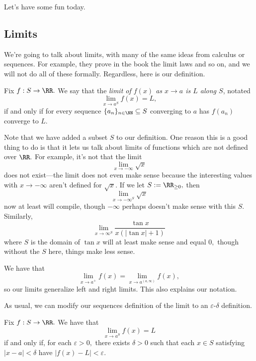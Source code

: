 













Let's have some fun today.

\subsection{Limits}
We're going to talk about limits, with many of the same ideas from calculus or sequences. For example, they prove in the book the limit laws and so on, and we will not do all of these formally. Regardless, here is our definition.
\begin{definition}[Limits]
	Fix $f:S\to\RR.$ We say that the \textit{limit of $f(x)$ as $x\to a$ is $L$ along $S$}, notated
	\[\lim_{x\to a^S}f(x)=L,\]
	if and only if for every sequence $\{a_n\}_{n\in\NN}\subseteq S$ converging to $a$ has $f(a_n)$ converge to $L.$
\end{definition}
Note that we have added a subset $S$ to our definition. One reason this is a good thing to do is that it lets us talk about limits of functions which are not defined over $\RR.$ For example, it's not that the limit
\[\lim_{x\to-\infty}\sqrt x\]
does not exist---the limit does not even make sense because the interesting values with $x\to-\infty$ aren't defined for $\sqrt x.$ If we let $S:=\RR_{\ge0},$ then
\[\lim_{x\to-\infty^S}\sqrt x\]
now at least will compile, though $-\infty$ perhaps doesn't make sense with this $S.$ Similarly,
\[\lim_{x\to\infty^S}\frac{\tan x}{x(|\tan x|+1)}\]
where $S$ is the domain of $\tan x$ will at least make sense and equal $0,$ though without the $S$ here, things make less sense.
\begin{remark}
	We have that
	\[\lim_{x\to a^+}f(x)=\lim_{x\to a^{(a,\infty)}}f(x),\]
	so our limits generalize left and right limits. This also explains our notation.
\end{remark}
As usual, we can modify our sequences definition of the limit to an $\varepsilon$-$\delta$ definition.
\begin{proposition}
	Fix $f:S\to\RR.$ We have that
	\[\lim_{x\to a^S}f(x)=L\]
	if and only if, for each $\varepsilon>0,$ there exists $\delta>0$ such that each $x\in S$ satisfying $|x-a|<\delta$ have $|f(x)-L|<\varepsilon.$
\end{proposition}
